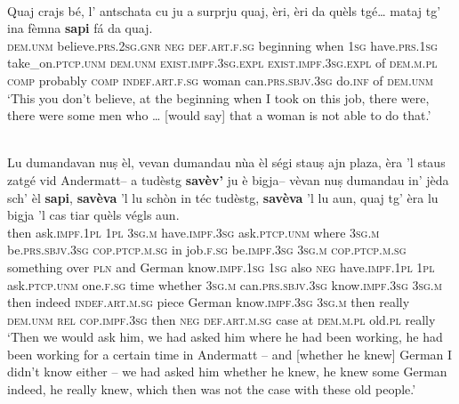 \ea
\label{ex:savaj5}
\\
\gll  Quaj crajs bé, l’ antschata cu ju a surprju quaj, èri, èri da quèls tgé… mataj\footnotemark{} tg’ ina fèmna \textbf{sapi} fá da quaj.\\
\textsc{dem.unm} believe.\textsc{prs.2sg.gnr} \textsc{neg} \textsc{def.art.f.sg} beginning when \textsc{1sg} have.\textsc{prs.1sg} take\_on.\textsc{ptcp.unm} \textsc{dem.unm} \textsc{exist.impf.3sg.expl} \textsc{exist.impf.3sg.expl} of \textsc{dem.m.pl} \textsc{comp} probably \textsc{comp} \textsc{indef.art.f.sg} woman can.\textsc{prs.sbjv.3sg} do.\textsc{inf} of \textsc{dem.unm}\\
\glt `This you don’t believe, at the beginning when I took on this job, there were, there were some men who … [would say] that a woman is not able to do that.'
\z

\ea
\label{ex:savaj6}
\\
\gll Lu dumandavan nuṣ èl, vevan dumandau nùa èl ségi stauṣ ajn plaza, èra ’l staus zatgé vid Andermatt– a tudèstg \textbf{savèv’} ju è bigja– vèvan nuṣ dumandau in' jèda sch’ èl \textbf{sapi}, \textbf{savèva} ’l lu schòn in téc tudèstg, \textbf{savèva} ’l lu aun, quaj tg’ èra lu bigja ’l cas tiar quèls végls aun.   \\
then ask.\textsc{impf.1pl} \textsc{1pl} \textsc{3sg.m} have.\textsc{impf.3sg}  ask.\textsc{ptcp.unm} where \textsc{3sg.m} be.\textsc{prs.sbjv.3sg} \textsc{cop.ptcp.m.sg} in job.\textsc{f.sg} be.\textsc{impf.3sg} \textsc{3sg.m}  \textsc{cop.ptcp.m.sg} something over \textsc{pln} and German know.\textsc{impf.1sg} \textsc{1sg} also \textsc{neg} have.\textsc{impf.1pl} \textsc{1pl} ask.\textsc{ptcp.unm} one.\textsc{f.sg} time whether \textsc{3sg.m} can.\textsc{prs.sbjv.3sg} know.\textsc{impf.3sg} \textsc{3sg.m} then indeed \textsc{indef.art.m.sg} piece German know.\textsc{impf.3sg} \textsc{3sg.m} then really \textsc{dem.unm} \textsc{rel} \textsc{cop.impf.3sg} then \textsc{neg} \textsc{def.art.m.sg} case at \textsc{dem.m.pl} old.\textsc{pl} really \\
\glt `Then we would ask him, we had asked him where he had been working, he had been working for a certain time in Andermatt – and [whether he knew] German I didn't know either – we had asked him whether he knew, he knew some German indeed, he really knew, which then was not the case with these old people.'
\z

